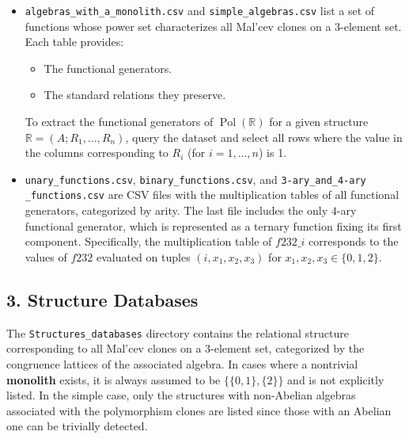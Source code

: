 \documentclass[12pt]{amsart}
\theoremstyle{definition}
\theoremstyle{definition}
\DeclareMathOperator{\Pol}{Pol}
\begin{document}
\begin{itemize}
    \item \texttt{algebras\_with\_a\_monolith.csv} and \texttt{simple\_algebras.csv} list a set of functions whose power set characterizes all Mal'cev clones on a 3-element set. Each table provides:
    \begin{itemize}
        \item The functional generators.
        \item The standard relations they preserve.
    \end{itemize}
    To extract the functional generators of \(\Pol(\mathbb R)\) for a given structure \( \mathbb R = (A; R_1, \dots, R_n) \), query the dataset and select all rows where the value in the columns corresponding to \( R_i \) (for \( i = 1, \dots, n \)) is 1.

    \item \texttt{unary\_functions.csv}, \texttt{binary\_functions.csv}, and \texttt{3-ary\_and\_4-ary} \texttt{\_functions.csv} are CSV files with the multiplication tables of all functional generators, categorized by arity. The last file includes the only $4$-ary functional generator, which is represented as a ternary function fixing its first component. Specifically, the multiplication table of $f232\_i$ corresponds to the values of $f232$ evaluated on tuples $(i, x_1, x_2, x_3)$ for $x_1, x_2, x_3 \in \{0,1,2\}$.

\end{itemize}




\subsection*{3. Structure Databases}  
The \texttt{Structures\_databases} directory contains the relational structure corresponding to all Mal'cev clones on a 3-element set, categorized by the congruence lattices of the associated algebra. In cases where a nontrivial \textbf{monolith} exists, it is always assumed to be \( \{\{0,1\}, \{2\}\} \) and is not explicitly listed. In the simple case, only the structures with non-Abelian algebras associated with the polymorphism clones are listed since those with an Abelian one can be trivially detected.
\end{document}
